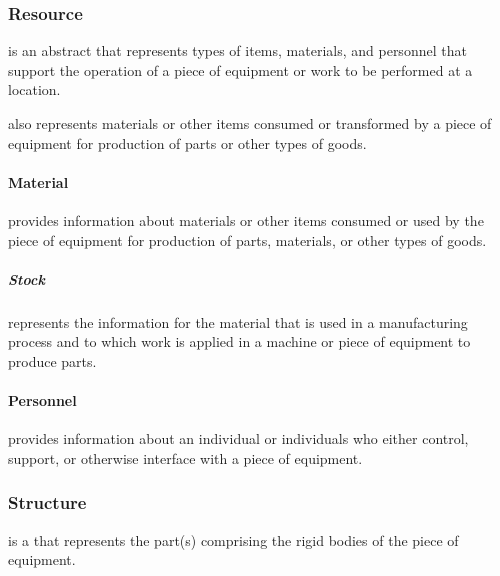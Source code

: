 \subsubsection{Resource}
\label{sec:Resource}



 is an abstract  that represents types of items, materials, and personnel that support the operation of a piece of equipment or work to be performed at a location.

 also represents materials or other items consumed or transformed by a piece of equipment for production of parts or other types of goods.



\paragraph{Material}\mbox{}
\label{sec:Material}


 provides information about materials or other items consumed or used by the piece of equipment for production of parts, materials, or other types of goods.



\subparagraph{Stock}\mbox{}
\label{sec:Stock}


 represents the information for the material that is used in a manufacturing process and to which work is applied in a machine or piece of equipment to produce parts.



\paragraph{Personnel}\mbox{}
\label{sec:Personnel}


 provides information about an individual or individuals who either control, support, or otherwise interface with a piece of equipment.




\subsubsection{Structure}
\label{sec:Structure}



 is a  that represents the part(s) comprising the rigid bodies of the piece of equipment.



